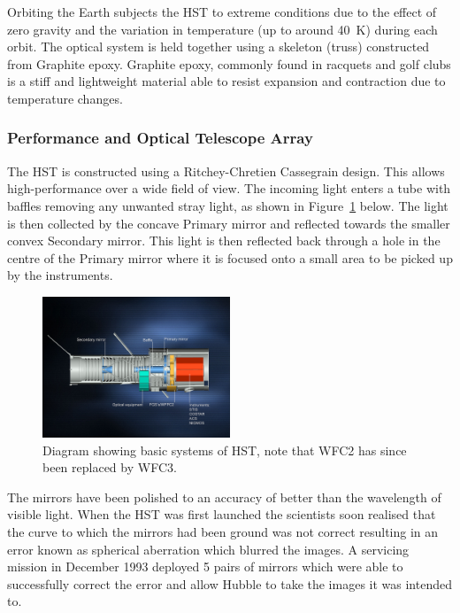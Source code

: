 		Orbiting the Earth subjects the HST to extreme conditions due to the effect of zero gravity and the variation in temperature (up to around \SI{40}{\kelvin}) during each orbit. The optical system is held together using a skeleton (truss) constructed from Graphite epoxy. Graphite epoxy, commonly found in racquets and golf clubs is a stiff and lightweight material able to resist expansion and contraction due to temperature changes\cite{Hubsite_4}.

	\subsubsection{Performance and Optical Telescope Array} %
	\label{ssub:performance_and_optical_telescope_array}
		The HST is constructed using a Ritchey-Chretien Cassegrain design. This allows high-performance over a wide field of view. The incoming light enters a tube with baffles removing any unwanted stray light, as shown in Figure~\ref{fig:HST_optical_diagram} below. The light is then collected by the concave Primary mirror and reflected towards the smaller convex Secondary mirror. This light is then reflected back through a hole in the centre of the Primary mirror where it is focused onto a small area to be picked up by the instruments\cite{Hubsite_5}.
		\begin{figure}[htbp]
			\centering
			\includegraphics[width=0.5\textwidth]{../Images/HST_optical_diagram.jpg}
			\caption{Diagram showing basic systems of HST, note that WFC2 has since been replaced by WFC3.\label{fig:HST_optical_diagram}}
		\end{figure}

		The mirrors have been polished to an accuracy of better than the wavelength of visible light. When the HST was first launched the scientists soon realised that the curve to which the mirrors had been ground was not correct resulting in an error known as spherical aberration which blurred the images. A servicing mission in December 1993 deployed 5 pairs of mirrors which were able to successfully correct the error and allow Hubble to take the images it was intended to\cite{ESA_1}.

